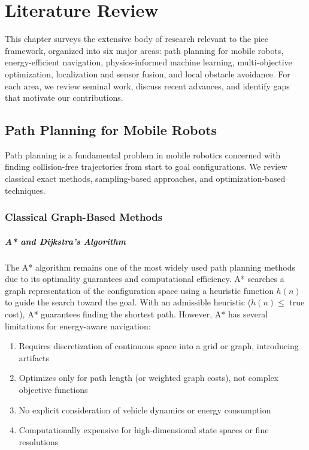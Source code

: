 \chapter{Literature Review}
\label{ch:literature}

This chapter surveys the extensive body of research relevant to the \acrshort{piec} framework, organized into six major areas: path planning for mobile robots, energy-efficient navigation, physics-informed machine learning, multi-objective optimization, localization and sensor fusion, and local obstacle avoidance. For each area, we review seminal work, discuss recent advances, and identify gaps that motivate our contributions.

\section{Path Planning for Mobile Robots}
\label{sec:lit_path_planning}

Path planning is a fundamental problem in mobile robotics concerned with finding collision-free trajectories from start to goal configurations. We review classical exact methods, sampling-based approaches, and optimization-based techniques.

\subsection{Classical Graph-Based Methods}

\paragraph{A* and Dijkstra's Algorithm}
The A* algorithm \cite{Hart1968} remains one of the most widely used path planning methods due to its optimality guarantees and computational efficiency. A* searches a graph representation of the configuration space using a heuristic function $h(n)$ to guide the search toward the goal. With an admissible heuristic ($h(n) \leq$ true cost), A* guarantees finding the shortest path. However, A* has several limitations for energy-aware navigation:

\begin{enumerate}
    \item Requires discretization of continuous space into a grid or graph, introducing artifacts
    \item Optimizes only for path length (or weighted graph costs), not complex objective functions
    \item No explicit consideration of vehicle dynamics or energy consumption
    \item Computationally expensive for high-dimensional state spaces or fine resolutions
\end{enumerate}

